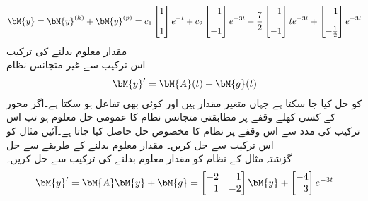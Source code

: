  \begin{align}
\bM{y}=\bM{y}^{(h)}+\bM{y}^{(p)}=c_1\begin{bmatrix} 1 \\[1em] 1 \end{bmatrix}e^{-t}+c_2\begin{bmatrix*}[r] 1\\[1em] -1 \end{bmatrix*}e^{-3t}-\frac{7}{2}\begin{bmatrix*}[r] 1\\[1em] -1 \end{bmatrix*}te^{-3t}+\begin{bmatrix*}[r] 1\\[1em]-\frac{1}{2} \end{bmatrix*}e^{-3t}
\end{align}
\quad مقدار معلوم بدلنے کی ترکیب\\
اس ترکیب سے غیر متجانس نظام
\begin{align}\label{مساوات_نظام_غیر_متجانس_مقدار_معلوم_الف}
\bM{y}'=\bM{A}(t)+\bM{g}(t)
\end{align}
کو حل کیا جا سکتا ہے جہاں  متغیر مقدار ہیں اور  کوئی بھی تفاعل ہو سکتا ہے۔اگر  محور کے کسی کھلے وقفے  پر  مطابقتی متجانس نظام کا عمومی حل  معلوم ہو تب اس ترکیب کی مدد سے اس وقفے پر نظام  کا مخصوص حل  حاصل کیا جاتا ہے۔آئیں مثال  کو اس ترکیب سے حل کریں۔
\quad مقدار معلوم بدلنے کے طریقے سے حل\\
گزشتہ مثال کے نظام  کو مقدار معلوم بدلنے کی ترکیب سے حل کریں۔
\begin{align}
\bM{y}'=\bM{A}\bM{y}+\bM{g}=\begin{bmatrix*}[r] -2&1\\1&-2 \end{bmatrix*} \bM{y}+\begin{bmatrix*}[r] -4\\3 \end{bmatrix*} e^{-3t}
\end{align}

